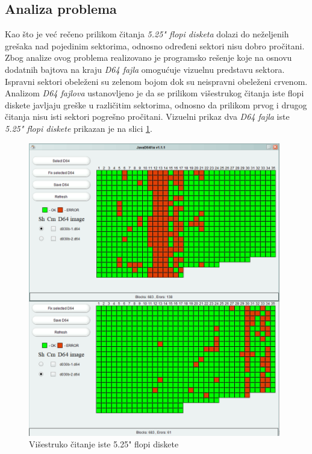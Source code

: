 \subsection{Analiza problema}

Kao što je već rečeno prilikom čitanja \textit{5.25" flopi disketa} dolazi do  \newline neželjenih grešaka nad pojedinim sektorima, odnosno određeni sektori nisu dobro pročitani. Zbog analize ovog problema realizovano je programsko rešenje koje na osnovu dodatnih bajtova na kraju \textit{D64 fajla} omogućuje vizuelnu predstavu sektora. Ispravni sektori obeleženi su zelenom bojom dok su neispravni obeleženi crvenom. Analizom  \textit{D64 fajlova} ustanovljeno je da se prilikom višestrukog čitanja iste flopi diskete javljaju greške u različitim sektorima, odnosno da prilikom prvog i drugog čitanja nisu isti sektori pogrešno pročitani. Vizuelni prikaz dva  \textit{D64 fajla}  iste \textit{5.25" flopi diskete} prikazan je na slici \ref{img:visestrukoCitanje}.

\begin{figure}[ht]
\begin{center}
\includegraphics[width=11cm]{img/visestrukoCitanje.png}
\caption{Višestruko čitanje iste 5.25" flopi diskete}
\label{img:visestrukoCitanje}
\end{center}
\end{figure}